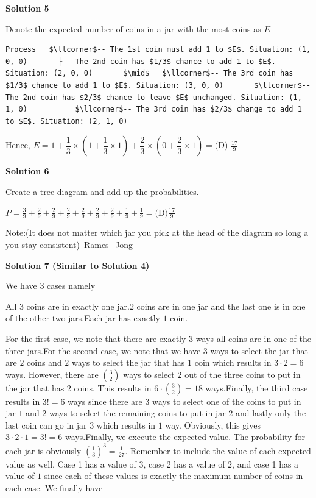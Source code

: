 \begin{enumerate}
\textbf{Solution 5}

Denote the expected number of coins in a jar with the most coins as $E$
\begin{verbatim}
Process   $\llcorner$-- The 1st coin must add 1 to $E$. Situation: (1, 0, 0)       ├-- The 2nd coin has $1/3$ chance to add 1 to $E$. Situation: (2, 0, 0)       $\mid$   $\llcorner$-- The 3rd coin has $1/3$ chance to add 1 to $E$. Situation: (3, 0, 0)       $\llcorner$-- The 2nd coin has $2/3$ chance to leave $E$ unchanged. Situation: (1, 1, 0)           $\llcorner$-- The 3rd coin has $2/3$ change to add 1 to $E$. Situation: (2, 1, 0)
\end{verbatim}

Hence, $E = 1 + \dfrac{1}{3} \times (1 + \dfrac{1}{3} \times 1) + \dfrac{2}{3} \times (0 + \dfrac{2}{3} \times 1) = \boxed{\text{(D) }\frac{17}{9}}$




\textbf{Solution 6}

Create a tree diagram and add up the probabilities.

 $P = \frac{3}{9} + \frac{2}{9} + \frac{2}{9} + \frac{2}{9} + \frac{2}{9} + \frac{2}{9} + \frac{2}{9} + \frac{1}{9} + \frac{1}{9} = \boxed{\text{(D)}\frac{17}{9}}$

 Note:(It does not matter which jar you pick at the head of the diagram so long a you stay consistent)~Rames\_Jong

 



\textbf{Solution 7 (Similar to Solution 4)}

We have $3$ cases namely

 All $3$ coins are in exactly one jar.$2$ coins are in one jar and the last one is in one of the other two jars.Each jar has exactly $1$ coin.

 For the first case, we note that there are exactly $3$ ways all coins are in one of the three jars.For the second case, we note that we have $3$ ways to select the jar that are $2$ coins and $2$ ways to select the jar that has $1$ coin which results in $3 \cdot 2 = 6$ ways. However, there are $\binom{3}{2}$ ways to select $2$ out of the three coins to put in the jar that has $2$ coins. This results in $6 \cdot \binom{3}{2} = 18$ ways.Finally, the third case results in $3! = 6$ ways since there are $3$ ways to select one of the coins to put in jar $1$ and $2$ ways to select the remaining coins to put in jar $2$ and lastly only the last coin can go in jar $3$ which results in $1$ way. Obviously, this gives $3 \cdot 2 \cdot 1 = 3! = 6$ ways.Finally, we execute the expected value. The probability for each jar is obviously $(\frac{1}{3})^3 = \frac{1}{27}$. Remember to include the value of each expected value as well. Case 1 has a value of $3$, case 2 has a value of $2$, and case 1 has a value of $1$ since each of these values is exactly the maximum number of coins in each case. We finally have


\end{enumerate}
